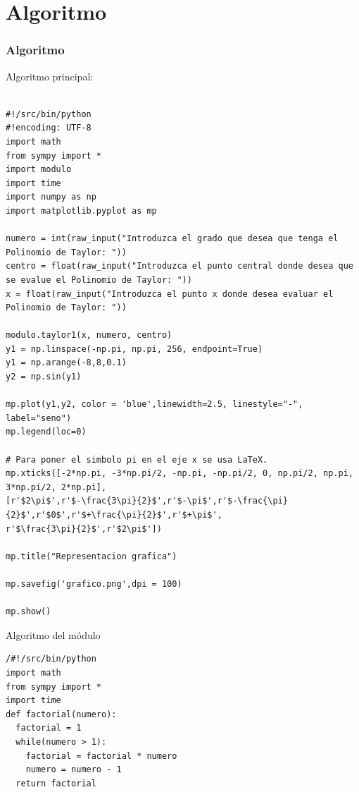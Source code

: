 \documentclass{beamer}
\begin{document}
\section{Algoritmo}
\frametitle{Algoritmo}
\tiny{
\begin{block}{Algoritmo principal:}
\begin{verbatim}

#!/src/bin/python
#!encoding: UTF-8
import math 
from sympy import *
import modulo
import time
import numpy as np 
import matplotlib.pyplot as mp

numero = int(raw_input("Introduzca el grado que desea que tenga el Polinomio de Taylor: "))
centro = float(raw_input("Introduzca el punto central donde desea que se evalue el Polinomio de Taylor: "))
x = float(raw_input("Introduzca el punto x donde desea evaluar el Polinomio de Taylor: "))

modulo.taylor1(x, numero, centro)
y1 = np.linspace(-np.pi, np.pi, 256, endpoint=True)
y1 = np.arange(-8,8,0.1)
y2 = np.sin(y1)
  
mp.plot(y1,y2, color = 'blue',linewidth=2.5, linestyle="-", label="seno")  
mp.legend(loc=0) 

# Para poner el simbolo pi en el eje x se usa LaTeX.
mp.xticks([-2*np.pi, -3*np.pi/2, -np.pi, -np.pi/2, 0, np.pi/2, np.pi, 3*np.pi/2, 2*np.pi],
[r'$2\pi$',r'$-\frac{3\pi}{2}$',r'$-\pi$',r'$-\frac{\pi}{2}$',r'$0$',r'$+\frac{\pi}{2}$',r'$+\pi$',
r'$\frac{3\pi}{2}$',r'$2\pi$'])  

mp.title("Representacion grafica")         
 
mp.savefig('grafico.png',dpi = 100)

mp.show()
\end{verbatim}
\end{block}
\begin{block}{Algoritmo del módulo}
\begin{verbatim}
/#!/src/bin/python
import math
from sympy import *
import time
def factorial(numero):
  factorial = 1
  while(numero > 1):
    factorial = factorial * numero
    numero = numero - 1
  return factorial


\end{verbatim}
\end{block}}
\end{document}
